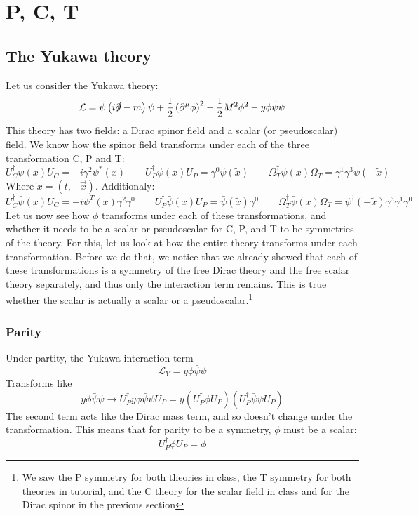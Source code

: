 \documentclass{article}
\begin{document}
\section{P, C, T}
\subsection{The Yukawa theory}
Let us consider the Yukawa theory:
\begin{equation}
    \mathcal{L} = \bar{\psi}\left(i\slashed{\partial} - m\right)\psi +
    \frac{1}{2}\left(\partial^\mu\phi\right)^2 -
    \frac{1}{2}M^2\phi^2 -
    y\phi\bar{\psi}\psi
\end{equation}
This theory has two fields: a Dirac spinor field and a scalar (or pseudoscalar) field. We know how the spinor field transforms under each of the three transformation C, P and T:
\begin{equation}
    U_C^\dagger \psi(x) U_C = -i\gamma^2\psi^*(x)
    \qquad
    U_P^\dagger \psi(x) U_P = \gamma^0 \psi(\tilde{x})
    \qquad
    \Omega_T^\dagger \psi(x) \Omega_T = \gamma^1\gamma^3 \psi(-\tilde{x})
\end{equation}
Where $\tilde{x} = (t, -\vec{x})$. Additionaly:
\begin{equation}
    U_C^\dagger \bar{\psi}(x) U_C = -i\psi^T(x)\gamma^2\gamma^0
    \qquad
    U_P^\dagger \bar{\psi}(x) U_P = \bar{\psi}(\tilde{x}) \gamma^0
    \qquad
    \Omega_T^\dagger \bar{\psi}(x) \Omega_T = \psi^\dagger(-\tilde{x})\gamma^3\gamma^1\gamma^0
\end{equation}
Let us now see how $\phi$ transforms under each of these transformations, and whether it needs to be a scalar or pseudoscalar for C, P, and T to be symmetries of the theory. For this, let us look at how the entire theory transforms under each transformation. Before we do that, we notice that we already showed that each of these transformations is a symmetry of the free Dirac theory and the free scalar theory separately, and thus only the interaction term remains. This is true whether the scalar is actually a scalar or a pseudoscalar.\footnote{We saw the P symmetry for both theories in class, the T symmetry for both theories in tutorial, and the C theory for the scalar field in class and for the Dirac spinor in the previous section}
\subsubsection{Parity}
Under partity, the Yukawa interaction term
\begin{equation}
    \mathcal{L}_Y = y\phi\bar{\psi}\psi
\end{equation}
Transforms like
\begin{equation}
    y\phi\bar{\psi}\psi \rightarrow U_P^\dagger y\phi\bar{\psi}\psi U_P = y \left(U_P^\dagger \phi U_P\right) \left(U_P^\dagger \bar{\psi} \psi U_P\right)
\end{equation}
The second term acts like the Dirac mass term, and so doesn't change under the transformation. This means that for parity to be a symmetry, $\phi$ must be a scalar:
\begin{equation}
    U_P^\dagger \phi U_P = \phi
\end{equation}
\end{document}
